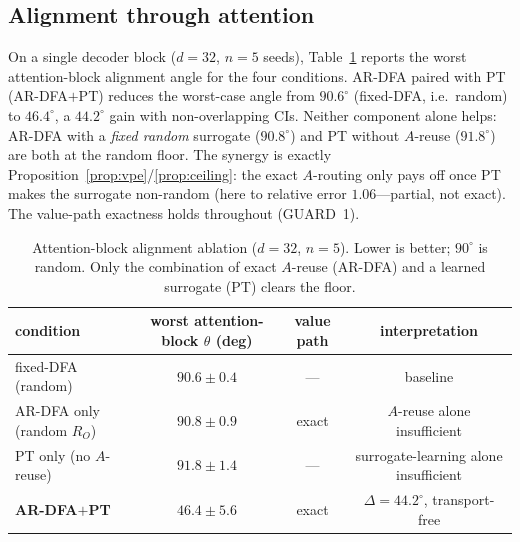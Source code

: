 \documentclass[11pt]{article}
\newcommand{\ARDFA}{\textsc{AR-DFA}}
\newcommand{\PT}{\textsc{PT}}
\begin{document}
\subsection{Alignment through attention}\label{sec:res-attn}
On a single decoder block ($d=32$, $n=5$ seeds), Table~\ref{tab:attn} reports the worst attention-block alignment angle for the four conditions. \ARDFA{} paired with \PT{} (\ARDFA$+$\PT) reduces the worst-case angle from $90.6^{\circ}$ (fixed-DFA, i.e.\ random) to $46.4^{\circ}$, a $44.2^{\circ}$ gain with non-overlapping CIs. Neither component alone helps: \ARDFA{} with a \emph{fixed random} surrogate ($90.8^{\circ}$) and \PT{} without $A$-reuse ($91.8^{\circ}$) are both at the random floor. The synergy is exactly Proposition~\ref{prop:vpe}/\ref{prop:ceiling}: the exact $A$-routing only pays off once \PT{} makes the surrogate non-random (here to relative error $1.06$---partial, not exact). The value-path exactness holds throughout (GUARD~1).
\begin{table}[H]
\centering\footnotesize
\begin{tabular}{@{}lccc@{}}
\toprule
condition & worst attention-block $\theta$ (deg) & value path & interpretation \\
\midrule
fixed-DFA (random) & $90.6\pm0.4$ & --- & baseline \\
\ARDFA{} only (random $R_O$) & $90.8\pm0.9$ & exact & $A$-reuse alone insufficient \\
\PT{} only (no $A$-reuse) & $91.8\pm1.4$ & --- & surrogate-learning alone insufficient \\
\textbf{\ARDFA$+$\PT} & $\mathbf{46.4\pm5.6}$ & exact & $\Delta=44.2^{\circ}$, transport-free \\
\bottomrule
\end{tabular}
\caption{Attention-block alignment ablation ($d=32$, $n=5$). Lower is better; $90^{\circ}$ is random. Only the combination of exact $A$-reuse (\ARDFA) and a learned surrogate (\PT) clears the floor.}
\label{tab:attn}
\end{table}
\end{document}

